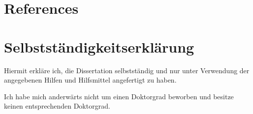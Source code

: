 \backmatter
\chapter{References}
\begin{hangparas}{.5in}{1}
\setlength{\parskip}{0pt}

\end{hangparas}

\chapter{Selbstständigkeitserklärung}
Hiermit erkläre ich, die Dissertation selbstständig und nur unter Verwendung der angegebenen Hilfen und Hilfsmittel angefertigt zu haben.

Ich habe mich anderwärts nicht um einen Doktorgrad beworben und besitze keinen entsprechenden Doktorgrad.

